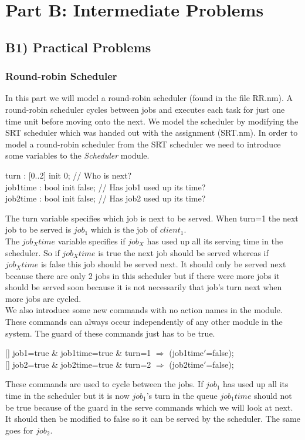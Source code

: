 \documentclass[12pt]{report}
\begin{document}
\chapter*{Part B: Intermediate Problems}
\section*{B1) Practical Problems}
\subsection*{Round-robin Scheduler}
In this part we will model a round-robin scheduler (found in the file RR.nm). A round-robin scheduler cycles between jobs and executes each task for just one time unit before moving onto the next. We model the scheduler by modifying the SRT scheduler which was handed out with the assignment (SRT.nm). In order to model a round-robin scheduler from the SRT scheduler we need to introduce some variables to the \emph{Scheduler} module.
\begin{center}
turn : {[0..2]} init 0; // Who is next?\\
job1time : bool init false; // Has job1 used up its time?\\
job2time : bool init false; // Has job2 used up its time?\\
\end{center}
The turn variable specifies which job is next to be served. When turn=1 the next job to be served is $job_1$ which is the job of $client_1$.\\
The $job_Xtime$ variable specifies if $job_X$ has used up all its serving time in the scheduler. So if $job_Xtime$ is true the next job should be served whereas if $job_Xtime$ is false this job should be served next. It should only be served next because there are only 2 jobs in this scheduler but if there were more jobs it should be served soon because it is not necessarily that job's turn next when more jobs are cycled.\\
We also introduce some new commands with no action names in the module. These commands can always occur independently of any other module in the system. The guard of these commands just has to be true.
\begin{center}
{[]} job1=true \& job1time=true \& turn=1 $\Rightarrow$ (job1time$'$=false);\\
{[]} job2=true \& job2time=true \& turn=2 $\Rightarrow$ (job2time$'$=false);
\end{center}
These commands are used to cycle between the jobs. If $job_1$ has used up all its time in the scheduler but it is now $job_1$'s turn in the queue $job_1time$ should not be true because of the guard in the serve commands which we will look at next. It should then be modified to false so it can be served by the scheduler. The same goes for $job_2$.\\
\end{document}
